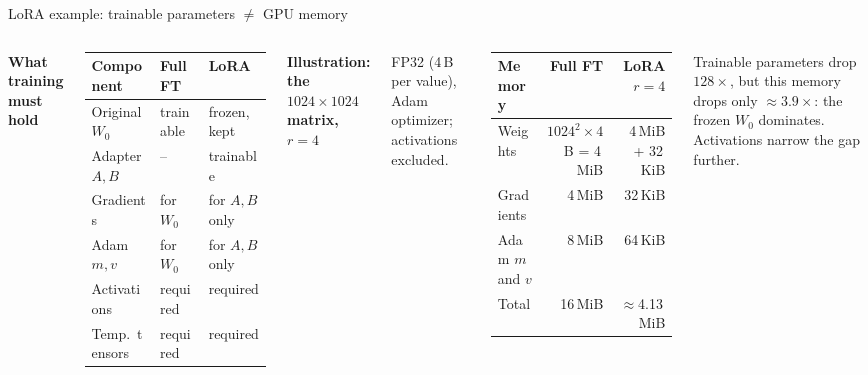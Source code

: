\documentclass[aspectratio=169,10pt]{beamer}
\gdef\srctext{}
\newcommand{\src}[1]{\gdef\srctext{#1}}
\begin{document}
\begin{frame}{LoRA example: trainable parameters $\neq$ GPU memory}
	\begin{columns}[T]
		\small\textbf{What training must hold}\par\smallskip
		\begin{tabular}{@{}lll@{}}\toprule
			Component      & Full FT   & LoRA           \\\midrule
			Original $W_0$ & trainable & frozen, kept   \\
			Adapter $A,B$  & --        & trainable      \\
			Gradients      & for $W_0$ & for $A,B$ only \\
			Adam $m,v$     & for $W_0$ & for $A,B$ only \\
			Activations    & required  & required       \\
			Temp.\ tensors & required  & required       \\\bottomrule
		\end{tabular}
		\small\textbf{Illustration: the $1024\times1024$ matrix, $r=4$}\par
		FP32 (4\,B per value), Adam optimizer; activations excluded.\par\smallskip
		\centering\begin{tabular}{@{}lrr@{}}\toprule
			Memory           & Full FT                     & LoRA $r=4$         \\\midrule
			Weights          & $1024^2\times4$\,B = 4\,MiB & 4\,MiB + 32\,KiB   \\
			Gradients        & 4\,MiB                      & 32\,KiB            \\
			Adam $m$ and $v$ & 8\,MiB                      & 64\,KiB            \\\midrule
			Total            & 16\,MiB                     & $\approx$4.13\,MiB \\\bottomrule
		\end{tabular}
		\par\raggedright\medskip Trainable parameters drop $128\times$, but this memory drops only $\approx3.9\times$: the frozen $W_0$ dominates. Activations narrow the gap further.
	\end{columns}
	\src{Byte counts are our arithmetic under the stated assumptions: $8{,}192\times4$\,B = 32\,KiB.}\end{frame}
\end{document}
